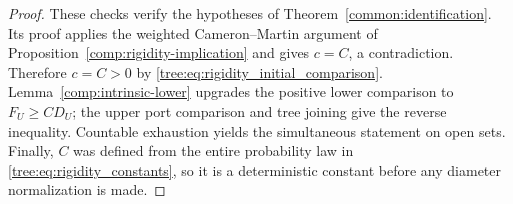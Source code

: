 \begin{proof}
These checks verify the hypotheses of Theorem~\ref{common:identification}.
Its proof applies the weighted Cameron--Martin argument of
Proposition~\ref{comp:rigidity-implication} and gives $c=C$, a contradiction. Therefore
\mbox{$c=C>0$} by \eqref{tree:eq:rigidity_initial_comparison}.
Lemma~\ref{comp:intrinsic-lower} upgrades the positive lower comparison
to $F_U\ge C D_U$; the upper port comparison and tree joining give
the reverse inequality. Countable exhaustion yields the simultaneous
statement on open sets. Finally, $C$ was defined from the entire
probability law in \eqref{tree:eq:rigidity_constants}, so it is a
deterministic constant before any diameter normalization is made.
\end{proof}
